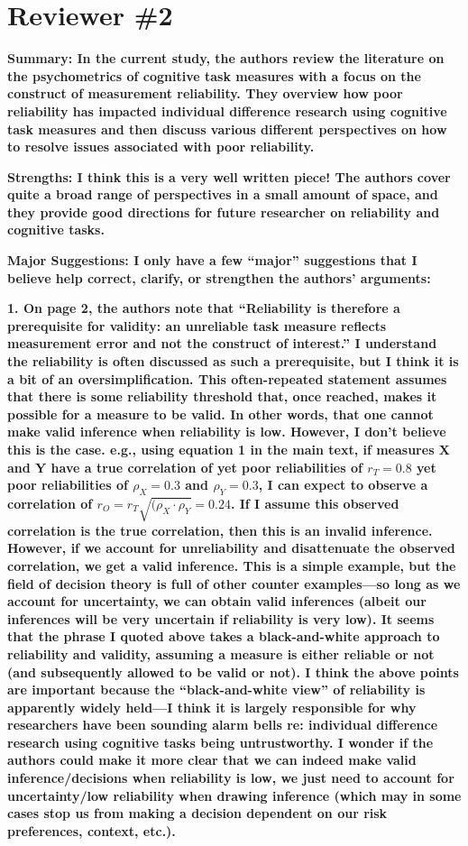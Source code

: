 \documentclass[a4paper,12pt]{article}
\begin{document}
\section*{Reviewer \#2}

\textbf{Summary: In the current study, the authors review the literature on the psychometrics of cognitive task measures with a focus on the construct of measurement reliability. They overview how poor reliability has impacted individual difference research using cognitive task measures and then discuss various different perspectives on how to resolve issues associated with poor reliability.}

\textbf{Strengths: I think this is a very well written piece! The authors cover quite a broad range of perspectives in a small amount of space, and they provide good directions for future researcher on reliability and cognitive tasks.}

\textbf{Major Suggestions: I only have a few ``major'' suggestions that I believe help correct, clarify, or strengthen the
authors’ arguments:}

\textbf{1. On page 2, the authors note that ``Reliability is therefore a prerequisite for validity: an unreliable task measure reflects measurement error and not the construct of interest.'' I understand the reliability is often discussed as such a prerequisite, but I think it is a bit of an oversimplification. This often-repeated statement assumes that there is some reliability threshold that, once reached, makes it possible for a measure to be valid. In other words, that one cannot make valid inference when reliability is low. However, I don't believe this is the case. e.g., using equation 1 in the main text, if measures X and Y have a true correlation of yet poor reliabilities of $r_T = 0.8$ yet poor reliabilities of $\rho_X = 0.3$ and $\rho_Y = 0.3$, I can expect to observe a correlation of $r_O= r_T \sqrt{(\rho_X \cdot \rho_Y} = 0.24$. If I assume this observed correlation is the true correlation, then this is an invalid inference. However, if we account for unreliability and disattenuate the observed correlation, we get a valid inference. This is a simple example, but the field of decision theory is full of other counter examples—so long as we account for uncertainty, we can obtain valid inferences (albeit our inferences will be very uncertain if reliability is very low). It seems that the phrase I quoted above takes a black-and-white approach to reliability and validity, assuming a measure is either reliable or not (and subsequently allowed to be valid or not). I think the above points are important because the ``black-and-white view'' of reliability is apparently widely held—I think it is largely responsible for why researchers have been sounding alarm bells re: individual difference research using cognitive tasks being untrustworthy. I wonder if the authors could make it more clear that we can indeed make valid inference/decisions when reliability is low, we just need to account for uncertainty/low reliability when drawing inference (which may in some cases stop us from making a decision dependent on our risk preferences, context, etc.).}
\end{document}
